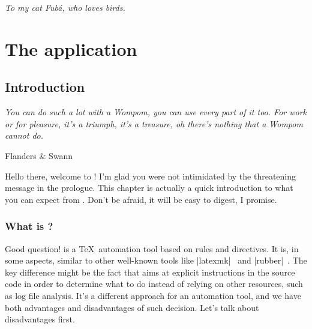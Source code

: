 \documentclass[a4paper,twoside,12pt]{memoir}
\begin{document}
\cleardoublepage

\vspace*{25em}

\begin{flushright}
\em To my cat Fubá, who loves birds.
\end{flushright}

\cleardoublepage

\tableofcontents*

\cleardoublepage

\listoffigures*

\cleardoublepage

\listoftables*

\cleardoublepage

\listofcodes*

\mainmatter

\part{The application}
\label{part:application}

\chapter{Introduction}
\label{chap:introduction}

\epigraph{\emph{You can do such a lot with a Wompom, you can use every part of it too.
For work or for pleasure, it's a triumph, it's a treasure,
oh there's nothing that a Wompom cannot do.}}{Flanders \& Swann}

Hello there, welcome to \arara! I'm glad you were not intimidated by the threatening
message in the prologue. This chapter is actually a quick introduction to what you
can expect from \arara. Don't be afraid, it will be easy to digest, I promise.

\section{What is \texorpdfstring{\arara}{arara}?}
\label{sec:whatisarara}

Good question! \arara is a \TeX\ automation tool based on rules and directives. It is,
in some aspects, similar to other well-known tools like |latexmk|~\cite{collins:2001}
and |rubber|~\cite{rubber:2009}. The key difference might be the fact that \arara
aims at explicit instructions in the source code in order to determine what to do instead
of relying on other resources, such as log file analysis. It's a different approach for an automation tool, and
we have both advantages and disadvantages of such decision. Let's talk about
disadvantages first.
\end{document}
